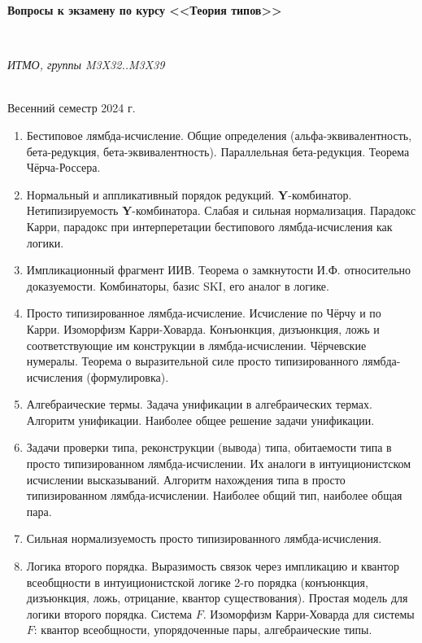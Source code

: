 \documentclass[11pt,a4paper,oneside]{article}
\begin{document}
\begin{center}
\begin{Large}{\bfseries Вопросы к экзамену по курсу <<Теория типов>>}\end{Large}\\
\vspace{1mm}
\begin{small} \itshape ИТМО, группы M3X32..M3X39\end{small}\\
\small Весенний семестр 2024 г.
\end{center}

\begin{enumerate}
\item Бестиповое лямбда-исчисление. Общие определения (альфа-эквивалентность, бета-редукция, бета-эквивалентность).
Параллельная бета-редукция. Теорема Чёрча-Россера.
\item Нормальный и аппликативный порядок редукций. \textbf{Y}-комбинатор.
Нетипизируемость \textbf{Y}-комбинатора. Слабая и сильная нормализация.
Парадокс Карри, парадокс при интерперетации бестипового лямбда-исчисления как логики.
\item Импликационный фрагмент ИИВ. Теорема о замкнутости И.Ф. относительно доказуемости.
Комбинаторы, базис SKI, его аналог в логике.
\item Просто типизированное лямбда-исчисление. Исчисление по Чёрчу и по Карри. Изоморфизм Карри-Ховарда.
Конъюнкция, дизъюнкция, ложь и соответствующие им конструкции в лямбда-исчислении. 
Чёрчевские нумералы. Теорема о выразительной силе просто типизированного лямбда-исчисления (формулировка).
\item Алгебраические термы. Задача унификации в алгебраических термах. Алгоритм унификации. Наиболее общее решение задачи унификации.
\item Задачи проверки типа, реконструкции (вывода) типа, обитаемости типа в просто типизированном лямбда-исчислении.
Их аналоги в интуиционистском исчислении высказываний. 
Алгоритм нахождения типа в просто типизированном лямбда-исчислении. Наиболее общий тип, наиболее общая пара.
\item Сильная нормализуемость просто типизированного лямбда-исчисления.
\item Логика второго порядка. Выразимость связок через импликацию и квантор всеобщности в интуиционистской логике 
2-го порядка (конъюнкция, дизъюнкция, ложь, отрицание, квантор существования). Простая модель для логики второго порядка.
Система $F$. Изоморфизм Карри-Ховарда для системы $F$: квантор всеобщности, упорядоченные пары, алгебраические типы.

\end{enumerate}
\end{document}
